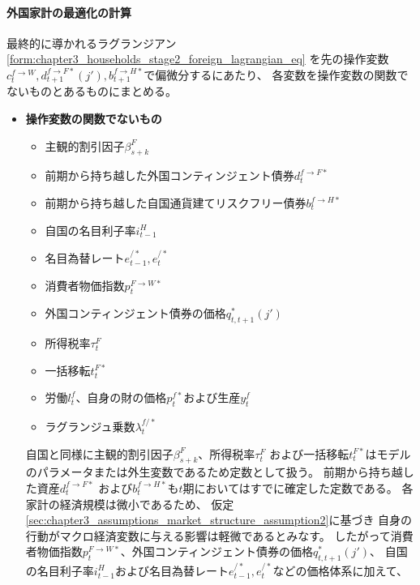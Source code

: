\paragraph{外国家計の最適化の計算}
\label{sec:household_optimization_foreign_calculation}
最終的に導かれるラグランジアン
\eqref{form:chapter3_households_stage2_foreign_lagrangian_eq}
を先の操作変数\(c_t^{f\to W}, d_{t+1}^{f\to F*}(j'), b_{t+1}^{f\to H*}\)で偏微分するにあたり、
各変数を操作変数の関数でないものとあるものにまとめる。
\begin{itemize}
    \item
    \label{itm:household_optimization_foreign_calculation_remark1}
        \textbf{操作変数の関数でないもの}
        \begin{itemize}
            \item 主観的割引因子\(\beta_{s+k}^F\)
            \item 前期から持ち越した外国コンティンジェント債券\(d_t^{f\to F*}\)
            \item 前期から持ち越した自国通貨建てリスクフリー債券\(b_t^{f\to H*}\)
            \item 自国の名目利子率\(i_{t-1}^H\)
            \item 名目為替レート\(e_{t-1}^{/*}, e_t^{/*}\)
            \item 消費者物価指数\(p_t^{F\to W*}\)
            \item 外国コンティンジェント債券の価格\(q_{t,t+1}^*(j')\)
            \item 所得税率\(\tau_t^F\)
            \item 一括移転\(t_t^{F*}\)
            \item 労働\(l_t^f\)、自身の財の価格\(p_t^{f*}\)および生産\(y_t^f\)
            \item ラグランジュ乗数\(\lambda_t^{f/*}\)
        \end{itemize}
        自国と同様に主観的割引因子\(\beta_{s+k}^F\)、所得税率\(\tau_t^F\)
        および一括移転\(t_t^{F*}\)はモデルのパラメータまたは外生変数であるため定数として扱う。
        前期から持ち越した資産\(d_t^{f\to F*}\)
        および\(b_t^{f\to H*}\)も\(t\)期においてはすでに確定した定数である。
        各家計の経済規模は微小であるため、
        仮定\eqref{sec:chapter3_assumptions_market_structure_assumption2}に基づき
        自身の行動がマクロ経済変数に与える影響は軽微であるとみなす。
        したがって消費者物価指数\(p_t^{F\to W*}\)、外国コンティンジェント債券の価格\(q_{t,t+1}^*(j')\)、
        自国の名目利子率\(i_{t-1}^H\)および名目為替レート\(e_{t-1}^{/*}, e_t^{/*}\)などの価格体系に加えて、

\end{itemize}
